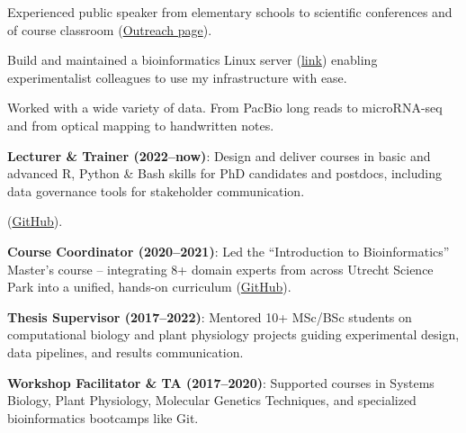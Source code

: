 \documentclass[a4paper,10pt]{article}
\begin{document}
{\begin{adjustbox}{valign=t}
\begin{minipage}[t]{0.6\textwidth}
\begin{description}
  \item Experienced public speaker from elementary schools to scientific conferences 
    and of course classroom 
    (\href{https://lauralwd.github.io/outreach/}{Outreach page}).
  \item Build and maintained a bioinformatics Linux server 
    (\href{https://lauralwd.github.io/blog/post-mpp-server/}{link}) 
    enabling experimentalist colleagues to use my infrastructure with ease.
  \item Worked with a wide variety of data. 
    From PacBio long reads to microRNA-seq and from optical mapping to handwritten notes.
\end{description}

\end{minipage}%
\end{adjustbox}%
}
\newpage

\begin{description}
  \raggedright
  \item \textbf{Lecturer \& Trainer (2022–now)}: Design and deliver courses in 
    basic and advanced R, Python \& Bash skills for PhD candidates and postdocs, 
    including data governance tools for stakeholder communication.

    (\href{https://github.com/lauralwd/professional_education}{GitHub}).
  \item \textbf{Course Coordinator (2020–2021)}: Led the “Introduction to Bioinformatics” Master’s course 
    -- integrating 8+ domain experts 
    from across Utrecht Science Park into a unified, hands-on curriculum 
    (\href{https://lauralwd.github.io/metagenomicspractical/}{GitHub}).
  \item \textbf{Thesis Supervisor (2017–2022)}: Mentored 10+ MSc/BSc students on computational biology and 
    plant physiology projects guiding experimental design, data pipelines, and results communication.
  \item \textbf{Workshop Facilitator \& TA (2017–2020)}: Supported courses in Systems Biology, Plant Physiology, 
    Molecular Genetics Techniques, and specialized bioinformatics bootcamps like Git.
\end{description}
\end{document}
